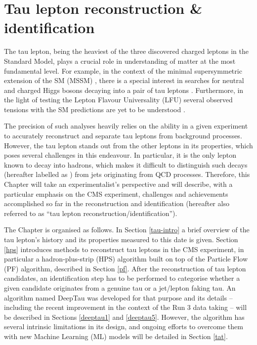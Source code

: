 \chapter{Tau lepton reconstruction \& identification}\label{sec:tau}

The tau lepton, being the heaviest of the three discovered charged leptons in the Standard Model, plays a crucial role in understanding of matter at the most fundamental level. For example, in the context of the minimal supersymmetric extension of the SM (MSSM) \cite{Fayet:1974pd, Fayet:1977yc}, there is a special interest in searches for neutral and charged Higgs bosons decaying into a pair of tau leptons \cite{CMS:2022goy}. Furthermore, in the light of testing the Lepton Flavour Universality (LFU) several observed tensions with the SM predictions are yet to be understood \cite{HFLAV:2022pwe, Cheaib:2022ral, LHCb:2017vlu, LHCb:2021trn}. 

The precision of such analyses heavily relies on the ability in a given experiment to accurately reconstruct and separate tau leptons from background processes. However, the tau lepton stands out from the other leptons in its properties, which poses several challenges in this endeavour. In particular, it is the only lepton known to decay into hadrons, which makes it difficult to distinguish such decays (hereafter labelled as \tauh) from jets originating from QCD processes. Therefore, this Chapter will take an experimentalist's perspective and will describe, with a particular emphasis on the CMS experiment, challenges and achievements accomplished so far in the \tauh reconstruction and identification (hereafter also referred to as \enquote{tau lepton reconstruction/identification}).

The Chapter is organised as follows. In Section \ref{tau-intro} a brief overview of the tau lepton's history and its properties measured to this date is given. Section \ref{hps} introduces methods to reconstruct tau leptons in the CMS experiment, in particular a hadron-plus-strip (HPS) algorithm built on top of the Particle Flow (PF) algorithm, described in Section \ref{pf}. After the reconstruction of tau lepton candidates, an identification step has to be performed to categorise whether a given candidate originates from a genuine tau or a jet/lepton faking tau. An algorithm named DeepTau was developed for that purpose and its details -- including the recent improvement in the context of the Run 3 data taking -- will be described in Sections \ref{deeptau1} and \ref{deeptau5}. However, the algorithm has several intrinsic limitations in its design, and ongoing efforts to overcome them with new Machine Learning (ML) models will be detailed in Section \ref{tat}.

